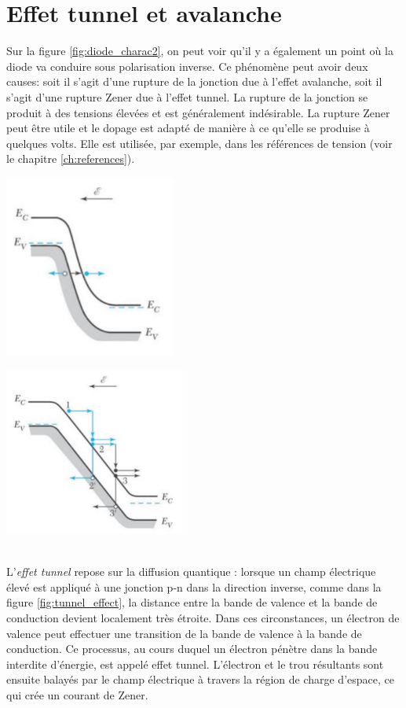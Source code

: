 \section{Effet tunnel et avalanche}
\label{sec:avalanche}
Sur la figure \ref{fig:diode_charac2}, on peut voir qu'il y a également un point où la diode va conduire sous polarisation inverse. Ce phénomène peut avoir deux causes: soit il s'agit d'une rupture de la jonction due à l'effet avalanche, soit il s'agit d'une rupture Zener due à l'effet tunnel. La rupture de la jonction se produit à des tensions élevées et est généralement indésirable. La rupture Zener peut être utile et le dopage est adapté de manière à ce qu'elle se produise à quelques volts. Elle est utilisée, par exemple, dans les références de tension (voir le chapitre \ref{ch:references}).\\
\begin{minipage}{.5\textwidth}
	\centering
	\includegraphics[height=6cm]{figures/ch01/tunnel_effect.jpg}
	\label{fig:tunnel_effect}
\end{minipage}
\begin{minipage}{.5\textwidth}
	\centering
	\includegraphics[width=6cm]{figures/ch01/avalanche.jpg}
	\label{fig:avalanche}
\end{minipage}\\
L'\emph{effet tunnel} repose sur la diffusion quantique : lorsque un champ électrique élevé est appliqué à une jonction p-n dans la direction inverse, comme dans la figure \ref{fig:tunnel_effect}, la distance entre la bande de valence et la bande de conduction devient localement très étroite. Dans ces circonstances, un électron de valence peut effectuer une transition de la bande de valence à la bande de conduction. Ce processus, au cours duquel un électron pénètre dans la bande interdite d'énergie, est appelé effet tunnel. L'électron et le trou résultants sont ensuite balayés par le champ électrique à travers la région de charge d'espace, ce qui crée un courant de Zener.

